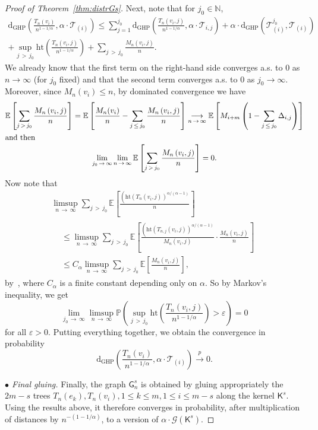 \documentclass[10pt]{amsart}
\theoremstyle{definition}\newtheorem{defi}[theo]{Definition}\newtheorem{rema}[theo]{Remark}\newtheorem{exam}[theo]{Example}\newtheorem{exem}[theo]{Example}\newtheorem{nota}[theo]{Notation}
\newcommand{\convprob}{\ensuremath{\stackrel{p}{\rightarrow}}}
\newcommand{\GHP}{\mathrm{GHP}}
\newcommand{\rmd}{\mathrm{d}}
\newcommand{\htl}{\mathrm{ht}}
\newcommand{\cG}{\mathcal{G}}
\newcommand{\cT}{\mathcal{T}}
\newcommand{\sG}{\mathsf{G}}
\newcommand{\sK}{\mathsf{K}}
\newcommand{\N}{\mathbb{N}}
\newcommand{\bbE}{\mathbb{E}}
\newcommand{\bbP}{\mathbb{P}}
\begin{document}
\begin{proof}[Proof of Theorem~\ref{thm:distrGs}]
Next, note that for $j_0 \in \N$,
\begin{multline*}
\rmd_{\GHP}\left(\frac{T_n(v_i)}{n^{1-1/\alpha}},\alpha \cdot \cT_{(i)} \right) \leq \sum_{j=1}^{j_0} \rmd_{\GHP}\left(\frac{T_n\left(v_{i}, j\right)}{n^{1-1/\alpha}},\alpha \cdot \cT_{i,j} \right) +\alpha \cdot \rmd_{\GHP}\left(\cT_{(i)}^{j_0},\cT_{(i)} \right) \\
+\sup_{j\,>\,j_0} \htl\left(\frac{T_n\left(v_{i}, j\right)}{n^{1-1/\alpha}}\right) + \sum_{j\,>\,j_0} \frac{M_n\left(v_{i},j\right)}{n}.
\end{multline*}
We already know that the first term on the right-hand side converges a.s. to 0 as $n \rightarrow \infty$ (for $j_0$ fixed) and that the second term converges a.s. to 0 as $j_0 \rightarrow \infty$. Moreover, since $M_n(v_i) \le n$, by dominated convergence we have
\begin{gather*}
\bbE\left[\sum_{j\,>\,j_0} \frac{M_n\left(v_{i},j\right)}{n}\right] =\bbE\left[\frac{M_n(v_i)}{n}-\sum_{j\,\leq\,j_0} \frac{M_n\left(v_{i},j\right)}{n}\right] \underset{n\,\rightarrow\,\infty}\longrightarrow \bbE\left[M_{i+m}\left(1- \sum_{j\,\leq\,j_0} \Delta_{i,j}\right)\right]
\\
\intertext{and then}
\lim_{j_0\,\rightarrow\,\infty} \lim_{n\,\rightarrow \,\infty} \bbE\left[\sum_{j\,>\,j_0} \frac{M_n\left(v_{i},j\right)}{n}\right] =0.
\end{gather*}
Now note that
\begin{multline*}
\limsup_{n\,\rightarrow\,\infty} \sum_{j\,>\,j_0}\bbE\left[\frac{\left(\htl\left(T_{n}\left(v_{i},j\right)\right)^{\alpha/(\alpha-1)}\right.}{n}\right]\\
\begin{aligned}
& \leq \limsup_{n\,\rightarrow\,\infty} \sum_{j\,> \,j_0} \bbE\left[\frac{\left(\htl\left(T_{n,j}\left(v_{i},j\right)\right)^{\alpha/(\alpha-1)}\right.}{M_{n}\left(v_{i},j\right)} \cdot \frac{M_{n}\left(v_{i},j\right)}{n} \right] \\
&\underset{}\leq C_{\alpha} \limsup_{n\,\rightarrow\,\infty} \sum_{j\,>\,j_0} \bbE\left[\frac{M_{n}(v_{i},j)}{n} \right],
\end{aligned}
\end{multline*}
by~\cite[Lemma~33]{HaasMiermont}, where $C_{\alpha}$ is a finite constant depending only on $\alpha$. So by Markov's inequality, we get
\[
\lim_{j_0\,\rightarrow\,\infty} \limsup_{n \,\rightarrow\,\infty}\bbP\left(\sup_{j\,>\,j_0} \htl\left(\frac{T_n\left(v_{i},j\right)}{n^{1-1/\alpha}}\right)>\varepsilon\right)=0
\]
for all $\varepsilon>0$. Putting everything together, we obtain the convergence in probability
\[
\rmd_{\GHP}\left(\frac{T_n(v_i)}{n^{1-1/\alpha}},\alpha \cdot \cT_{(i)} \right) \convprob 0.
\]

\emph{$\bullet$ Final gluing.} Finally, the graph $\sG_n^s$ is obtained by gluing appropriately the $2m-s$ trees $T_n(e_k), T_n(v_{i}), 1 \leq k \leq m, 1 \leq i \leq m-s$ along the kernel $\sK^s$. Using the results above, it therefore converges in probability, after multiplication of distances by $n^{-(1-1/\alpha)}$, to a version of $\alpha \cdot \cG(\sK^s)$.
\end{proof}
\end{document}
